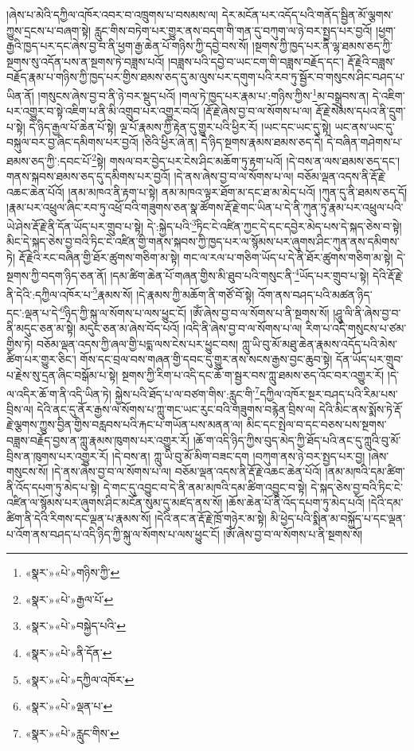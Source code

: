 །ཞེས་པ་མེའི་དཀྱིལ་འཁོར་འབར་བ་འཁྲུགས་པ་བསམས་ལ། དེར་མངོན་པར་འདོད་པའི་གནོད་སྦྱིན་མོ་ལྕགས་ཀྱུས་དྲངས་པ་བཞག་སྟེ། རླུང་གིས་བཏེག་པར་གྱུར་ནས་བདག་གི་གན་དུ་བཀུག་ལ་ཉེ་བར་སྤྱད་པར་བྱའོ། །ཕྱག་རྒྱའི་ཁྱད་པར་དང་ཞེས་བྱ་བ་ནི་ཕྱག་རྒྱ་ཆེན་པོ་གཉིས་ཀྱི་དབྱེ་བས་སོ། །སྔགས་ཀྱི་ཁྱད་པར་ནི་ལྷ་ཐམས་ཅད་ཀྱི་སྔགས་སུ་འདོན་པས་ན་སྔགས་ཏེ་བཟླས་པའོ། །བཟླས་པའི་དབྱེ་བ་ཡང་ངག་གི་བཟླས་བརྗོད་དང་། རྡོ་རྗེའི་བཟླས་བརྗོད་རྣམ་པ་གཉིས་ཀྱི་ཁྱད་པར་གྱིས་ཐམས་ཅད་དུ་མ་ལུས་པར་དགུག་པའི་རབ་ཏུ་སྦྱོར་བ་གསུངས་ཤིང་བཤད་པ་ཡིན་ནོ། །གསུངས་ཞེས་བྱ་བ་ནི་ཉེ་བར་སྡུད་པའོ། །གལ་ཏེ་ཁྱད་པར་རྣམ་པ་:གཉིས་ཀྱིས་\footnote{«སྣར་»«པེ་»གཉིས་ཀྱི་}མ་བསྒྲུབས་ན། དེ་འཇིག་པར་འགྱུར་བ་སྟེ་འཇིག་པ་ནི་མི་འགྲུབ་པར་འགྱུར་བའོ། །རྡོ་རྗེ་ཞེས་བྱ་བ་ལ་སོགས་པ་ལ། རྡོ་རྗེ་སེམས་དཔའ་ནི་དྲུག་པ་སྟེ། དེ་ཉིད་རྒྱལ་པོ་ཆེན་པོ་སྟེ། ལྔ་པོ་རྣམས་ཀྱི་རྟེན་དུ་གྱུར་པའི་ཕྱིར་རོ། །ཡང་དང་ཡང་དུ་སྟེ། ཡང་ནས་ཡང་དུ་བསྐུལ་བར་བྱ་ཞིང་དམིགས་པར་བྱའོ། །ཅིའི་ཕྱིར་ཞེ་ན། དེ་ཉིད་སྔགས་རྣམས་ཐམས་ཅད་དེ། དེ་བཞིན་གཤེགས་པ་ཐམས་ཅད་ཀྱི་:དབང་པོ་\footnote{«སྣར་»«པེ་»རྒྱལ་པོ་}སྟེ། གསལ་བར་བྱེད་པར་ངེས་ཤིང་མཆོག་ཏུ་རྟག་པའོ། །དེ་བས་ན་ལས་ཐམས་ཅད་དང་། གནས་སྐབས་ཐམས་ཅད་དུ་དམིགས་པར་བྱའོ། །དེ་ནས་ཞེས་བྱ་བ་ལ་སོགས་པ་ལ། བཅོམ་ལྡན་འདས་ནི་རྡོ་རྗེ་འཆང་ཆེན་པོའོ། །ནམ་མཁའ་ནི་རྟག་པ་སྟེ། ནམ་མཁའ་ལྟར་ཐོག་མ་དང་ཐ་མ་མེད་པའོ། །ཀུན་དུ་ནི་ཐམས་ཅད་དོ། །རྣམ་པར་འཕྲུལ་ཞིང་རབ་ཏུ་འཕྲོ་བའི་གཟུགས་ཅན་སྣ་ཚོགས་རྡོ་རྗེ་གང་ཡིན་པ་དེ་ནི་ཀུན་ཏུ་རྣམ་པར་འཕྲུལ་པའི་ཡེ་ཤེས་རྡོ་རྗེ་ནི་དོན་ཡོད་པར་གྲུབ་པ་སྟེ། དེ་:སྐྱེད་པའི་\footnote{«སྣར་»«པེ་»བསྐྱེད་པའི་}ཏིང་ངེ་འཛིན་ཀྱང་དེ་དང་དབྱེར་མེད་པས་དེ་སྐད་ཅེས་བ་སྟེ། མིང་དེ་སྐད་ཅེས་བྱ་བའི་ཏིང་ངེ་འཛིན་གྱི་གནས་སྐབས་ཀྱི་ཁྱད་པར་ལ་སྙོམས་པར་ཞུགས་ཤིང་ཀུན་ནས་དམིགས་ཏེ། རྡོ་རྗེའི་རང་བཞིན་གྱི་ཐོར་ཚུགས་གཅིག་མ་སྟེ། གང་ལ་རལ་པ་གཅིག་ཡོད་པ་དེ་ནི་ཐོར་ཚུགས་གཅིག་མ་སྟེ། དེ་སྔགས་ཀྱི་བདག་ཉིད་ཅན་ནོ། །དམ་ཚིག་ཆེན་པོ་གཞན་གྱིས་མི་ཐུབ་པའི་གསུང་ནི་\footnote{«སྣར་»«པེ་»ནི་དོན་}ཡོད་པར་གྲུབ་པ་སྟེ། དེའི་རྡོ་རྗེ་ནི་དེའི་:དཀྱིལ་འཁོར་པ་\footnote{«སྣར་»«པེ་»དཀྱིལ་འཁོར་}རྣམས་སོ། །དེ་རྣམས་ཀྱི་མཆོག་ནི་གཙོ་བོ་སྟེ། འོག་ནས་བཤད་པའི་མཚན་ཉིད་དང་:ལྡན་པ་དེ་\footnote{«སྣར་»«པེ་»ལྡན་པ་}ཉིད་ཀྱི་སྐུ་ལ་སོགས་པ་ལས་ཕྱུང་ངོ། །ཨོཾ་ཞེས་བྱ་བ་ལ་སོགས་པ་ནི་སྔགས་སོ། །ཤཱུ་ལི་ནི་ཞེས་བྱ་བ་ནི་མདུང་ཅན་མ་སྟེ། མདུང་ཅན་མ་ཞེས་བོད་པའོ། །འདི་ནི་ཞེས་བྱ་བ་ལ་སོགས་པ་ལ། རིག་པ་འདི་གསུངས་པ་ཙམ་གྱིས་ཏེ། བཅོམ་ལྡན་འདས་ཀྱི་ཞལ་གྱི་པདྨ་ལས་ངེས་པར་ཕྱུང་བས། ཀླུ་ཡི་བུ་མོ་མཐུ་ཆེན་རྣམས་འདོད་པའི་མེས་ཚིག་པར་གྱུར་ཅིང་། གོས་དང་བྲལ་བས་གཞན་གྱི་དབང་དུ་གྱུར་ནས་སངས་རྒྱས་བྱང་ཆུབ་སྟེ། དོན་ཡོད་པར་གྲུབ་པ་རྗེས་སུ་དྲན་ཞིང་བསྒོམ་པ་སྟེ། སྔགས་ཀྱི་རིག་པ་འདི་དང་ཆོ་ག་སྦྱར་བས་ཀླུ་ཐམས་ཅད་འོང་བར་འགྱུར་རོ། །དེ་ལ་འདིར་ཆོ་ག་ནི་འདི་ཡིན་ཏེ། སྐྱེས་པའི་ཐོད་པ་ལ་བཙག་གིས་:རླུང་གི་\footnote{«སྣར་»«པེ་»རླུང་གིས་}དཀྱིལ་འཁོར་སྔར་བཤད་པའི་རིམ་པས་བྲིས་ལ། དེའི་ནང་དུ་ནོར་རྒྱས་ལ་སོགས་པ་ཀླུ་གང་ཡང་རུང་བའི་གཟུགས་བརྙེན་བྲིས་ལ། དེའི་མིང་ནས་སྨོས་ཏེ་རྡོ་རྗེ་ལྕགས་ཀྱུས་བྱིན་གྱིས་བརླབས་པའི་རྐང་པ་གཡོན་པས་མནན་ལ། མིང་དང་སྤེལ་བ་དང་བཅས་པས་སྔགས་བཟླས་བརྗོད་བྱས་ན་ཀླུ་རྣམས་ཁུགས་པར་འགྱུར་རོ། །ཆོ་ག་འདི་ཉིད་ཀྱིས་བུད་མེད་ཀྱི་ཐོད་པའི་ནང་དུ་ཀླུའི་བུ་མོ་བྲིས་ན་ཁུགས་པར་འགྱུར་རོ། །དེ་བས་ན། ཀླུ་ཡི་བུ་མོ་མིག་བཟང་དག །བཀུག་ནས་ཉེ་བར་སྤྱད་པར་བྱ། །ཞེས་གསུངས་སོ། །དེ་ནས་ཞེས་བྱ་བ་ལ་སོགས་པ་ལ། བཅོམ་ལྡན་འདས་ནི་རྡོ་རྗེ་འཆང་ཆེན་པོའོ། །ནམ་མཁའི་དམ་ཚིག་ནི་འོད་དཔག་ཏུ་མེད་པ་སྟེ། དེ་གང་དུ་འབྱུང་བ་དེ་ནི་ནམ་མཁའི་དམ་ཚིག་འབྱུང་བ་སྟེ། དེ་སྐད་ཅེས་བྱ་བའི་ཏིང་ངེ་འཛིན་ལ་སྙོམས་པར་ཞུགས་ཤིང་མངོན་སུམ་དུ་མཛད་ནས་སོ། །ཆོས་ཆེན་པོ་ནི་འོད་དཔག་ཏུ་མེད་པའོ། །དེའི་དམ་ཚིག་ནི་དེའི་རིགས་དང་ལྡན་པ་རྣམས་སོ། །དེའི་ནང་ན་རྡོ་རྗེ་ཁྲོ་གཉེར་མ་སྟེ། མི་ཕྱེད་པའི་སྨིན་མ་བསྐྱོད་པ་དང་ལྡན་པ་འོག་ནས་བཤད་པ་འདི་ཉིད་ཀྱི་སྐུ་ལ་སོགས་པ་ལས་ཕྱུང་ངོ། །ཨོཾ་ཞེས་བྱ་བ་ལ་སོགས་པ་ནི་སྔགས་སོ། 